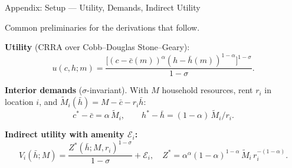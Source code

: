 \documentclass[11pt,aspectratio=169]{beamer}
\begin{document}
\begin{frame}{Appendix: Setup --- Utility, Demands, Indirect Utility \; \hyperlink{slide1-main}{}}
\label{app:setup}
\small

Common preliminaries for the derivations that follow.

\vspace{0.4em}
\textbf{Utility} (CRRA over Cobb--Douglas Stone--Geary):
\vspace{-0.4em}
\[
u(c,h;m) = \frac{\bigl[(c-\bar c(m))^\alpha(h-\bar h(m))^{1-\alpha}\bigr]^{1-\sigma}}{1-\sigma}.
\]

\vspace{0.2em}
\textbf{Interior demands} ($\sigma$-invariant). With $M$ household resources, rent $r_i$ in location $i$, and $\tilde M_i(\bar h) = M - \bar c - r_i\bar h$:
\vspace{-0.4em}
\[
c^\ast - \bar c = \alpha\,\tilde M_i,
\qquad
h^\ast - \bar h = (1-\alpha)\,\tilde M_i / r_i.
\]

\vspace{0.2em}
\textbf{Indirect utility with amenity $\mathcal E_i$:}
\vspace{-0.4em}
\[
V_i(\bar h; M) = \frac{Z^\ast(\bar h; M, r_i)^{1-\sigma}}{1-\sigma} + \mathcal E_i,
\quad
Z^\ast = \alpha^\alpha(1-\alpha)^{1-\alpha}\,\tilde M_i\,r_i^{-(1-\alpha)}.
\]
\end{frame}
\end{document}
